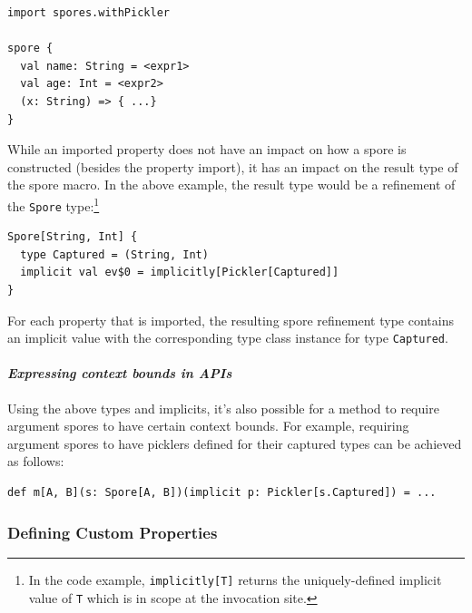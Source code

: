 \documentclass[runningheads]{llncs}
\begin{document}
\begin{sloppypar}
\begin{lstlisting}
import spores.withPickler

spore {
  val name: String = <expr1>
  val age: Int = <expr2>
  (x: String) => { ...}
}
\end{lstlisting}
\noindent While an imported property does not have an impact on how a spore is
constructed (besides the property import), it has an impact on the result type
of the spore macro. In the above example, the result type would be a
refinement of the \verb|Spore| type:\footnote{In the code example, \texttt{implicitly[T]} returns the uniquely-defined implicit value of \texttt{T} which is in scope at the invocation site.}


\begin{lstlisting}
Spore[String, Int] {
  type Captured = (String, Int)
  implicit val ev$0 = implicitly[Pickler[Captured]]
}
\end{lstlisting}
\noindent For each property that is imported, the resulting spore refinement type
contains an implicit value with the corresponding type class instance for type
\verb|Captured|.




\paragraph{\textbf{\textit{Expressing context bounds in APIs}}}

Using the above types and implicits, it's also possible for a method
to require argument spores to have certain context bounds. For example,
requiring argument spores to have picklers defined for their captured types
can be achieved as follows:

\begin{lstlisting}[numbers=none]
def m[A, B](s: Spore[A, B])(implicit p: Pickler[s.Captured]) = ...
\end{lstlisting}


\subsubsection{Defining Custom Properties}


\end{sloppypar}
\end{document}

